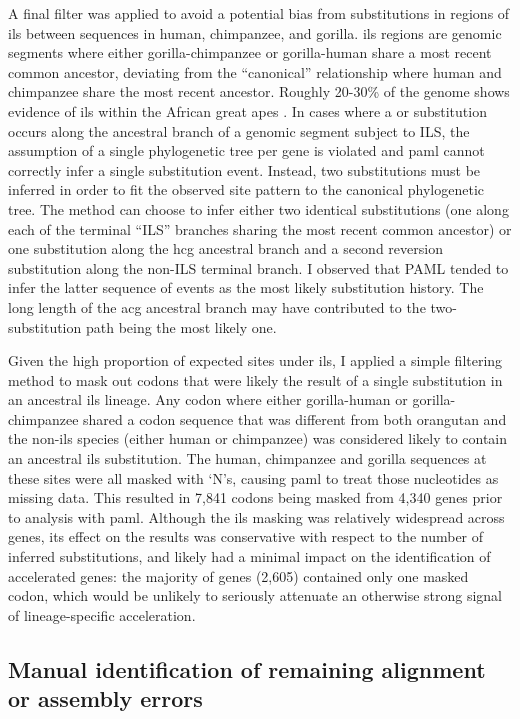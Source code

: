 A final filter was applied to avoid a potential bias from
substitutions in regions of \ac{ils} between sequences in human,
chimpanzee, and gorilla. \ac{ils} regions are genomic segments where
either gorilla-chimpanzee or gorilla-human share a most recent common
ancestor, deviating from the ``canonical'' relationship where human
and chimpanzee share the most recent ancestor. Roughly 20-30\% of the
genome shows evidence of \ac{ils} within the African great apes
\citep{Hobolth2007}. In cases where a \syn or \nsyn substitution
occurs along the ancestral branch of a genomic segment subject to ILS,
the assumption of a single phylogenetic tree per gene is violated and
\ac{paml} cannot correctly infer a single substitution event. Instead,
two substitutions must be inferred in order to fit the observed site
pattern to the canonical phylogenetic tree. The method can choose to
infer either two identical substitutions (one along each of the
terminal ``ILS'' branches sharing the most recent common ancestor) or
one substitution along the \ac{hcg} ancestral branch and a second
reversion substitution along the non-ILS terminal branch. I observed
that PAML tended to infer the latter sequence of events as the most
likely substitution history. The long length of the \ac{acg} ancestral
branch may have contributed to the two-substitution path being the
most likely one.

Given the high proportion of expected sites under \ac{ils}, I applied
a simple filtering method to mask out codons that were likely the
result of a single substitution in an ancestral \ac{ils} lineage. Any
codon where either gorilla-human or gorilla-chimpanzee shared a codon
sequence that was different from both orangutan and the non-\ac{ils}
species (either human or chimpanzee) was considered likely to contain
an ancestral \ac{ils} substitution. The human, chimpanzee and gorilla
sequences at these sites were all masked with `N's, causing \ac{paml}
to treat those nucleotides as missing data. This resulted in 7,841
codons being masked from 4,340 genes prior to analysis with
\ac{paml}. Although the \ac{ils} masking was relatively widespread
across genes, its effect on the results was conservative with respect
to the number of inferred substitutions, and likely had a minimal
impact on the identification of accelerated genes: the majority of
genes (2,605) contained only one masked codon, which would be unlikely
to seriously attenuate an otherwise strong signal of lineage-specific
acceleration.

\subsection{Manual identification of remaining alignment or assembly errors}

